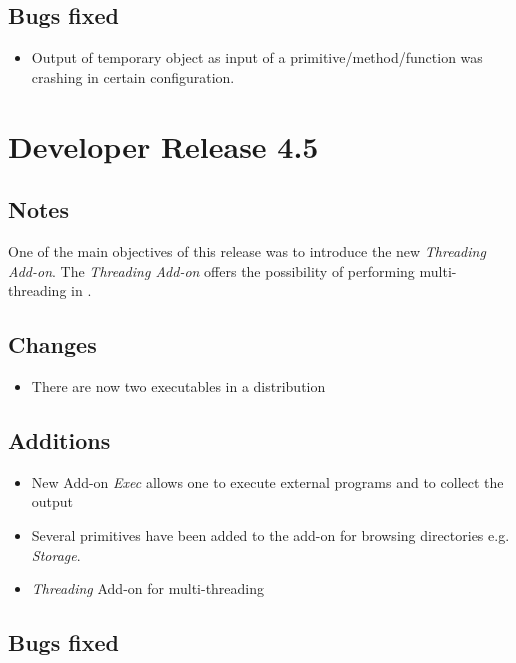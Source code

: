 \subsection{Bugs fixed}

\begin{itemize}
\item Output of temporary object as input of a primitive/method/function was crashing in certain configuration.
\end{itemize}

\section{Developer Release 4.5}

\subsection{Notes}

One of the main objectives of this release was to introduce the new {\em Threading Add-on}.  The {\em Threading Add-on} offers the possibility of performing multi-threading in \squirrel.

\subsection{Changes}

\begin{itemize}
\item There are now two executables in a \squirrel distribution
\end{itemize}

\subsection{Additions}

\begin{itemize}
\item New Add-on {\em Exec} allows one to execute external programs and to collect the output
\item Several primitives have been added to the add-on for browsing directories e.g. {\em Storage}.
\item {\em Threading} Add-on for multi-threading
\end{itemize}

\subsection{Bugs fixed}

